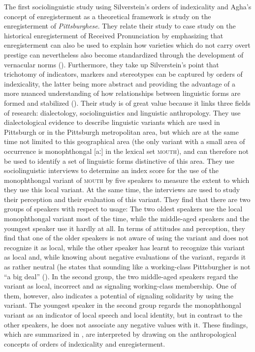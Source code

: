 The first sociolinguistic study using Silverstein’s orders of indexicality and Agha’s concept of enregisterment as a theoretical framework is  study on the enregisterment of \textit{Pittsburghese}. They relate their study to  case study on the historical enregisterment of Received Pronunciation by emphasizing that enregisterment can also be used to explain how varieties which do not carry overt prestige can nevertheless also become standardized through the development of vernacular norms (\citeyear[80]{Johnstone2006}). Furthermore, they take up Silverstein’s point that  trichotomy of indicators, markers and stereotypes can be captured by orders of indexicality, the latter being more abstract and providing the advantage of a more nuanced understanding of how relationships between linguistic forms are formed and stabilized (\citeyear[81]{Johnstone2006}). Their study is of great value because it links three fields of research: dialectology, sociolinguistics and linguistic anthropology. They use dialectological evidence to describe linguistic variants which are used in Pittsburgh or in the Pittsburgh metropolitan area, but which are at the same time not limited to this geographical area (the only variant with a small area of occurrence is monophthongal [aː] in the lexical set \textsc{mouth}), and can therefore not be used to identify a set of linguistic forms distinctive of this area. They use sociolinguistic interviews to determine an index score for the use of the monophthongal variant of \textsc{mouth} by five speakers to measure the extent to which they use this local variant. At the same time, the interviews are used to study their perception and their evaluation of this variant. They find that there are two groups of speakers with respect to usage: The two oldest speakers use the local monophthongal variant most of the time, while the middle-aged speakers and the youngest speaker use it hardly at all. In terms of attitudes and perception, they find that one of the older speakers is not aware of using the variant and does not recognize it as local, while the other speaker has learnt to recognize this variant as local and, while knowing about negative evaluations of the variant, regards it as rather neutral (he states that sounding like a working-class Pittsburgher is not “a big deal” (\citeyear[89]{Johnstone2006}). In the second group, the two middle-aged speakers regard the variant as local, incorrect and as signaling working-class membership. One of them, however, also indicates a potential of signaling solidarity by using the variant. The youngest speaker in the second group regards the monophthongal variant as an indicator of local speech and local identity, but in contrast to the other speakers, he does not associate any negative values with it. These findings, which are summarized in , are interpreted by drawing on the anthropological concepts of orders of indexicality and enregisterment.

